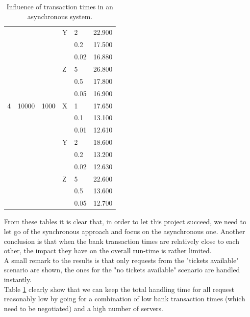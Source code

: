 \documentclass[10pt,a4paper,twocolumn]{article}
\begin{document}
\begin{table}[t]
{\begin{tabular}{llllll}
									&									& 								  &Y				   & 2 							& 22.900 \\
									&									& 								  &						& 0.2 						& 17.500\\
									&									& 								  &						& 0.02 					   & 16.880 \\
									&									& 								  &Z				   & 5 							& 26.800 \\
									&									& 								  &						& 0.5 						& 17.800\\
									&									& 								  &						& 0.05 					   & 16.900\\
	4 								& 10000 					  & 1000 						& X					 & 1 						  & 17.650 \\
									&									& 								  &						& 0.1 						& 13.100 \\
									&									& 								  &						& 0.01 					   & 12.610 \\
									&									& 								  &Y				   & 2 							& 18.600 \\
									&									& 								  &						& 0.2 						& 13.200\\
									&									& 								  &						& 0.02 					   & 12.630 \\
									&									& 								  &Z				   & 5 							& 22.600 \\
									&									& 								  &						& 0.5 						& 13.600\\
									&									& 								  &						& 0.05 					   & 12.700\\
	\end{tabular}}
	\caption{\label{tab:banking-time-influence-asynchronous}Influence of transaction times in an asynchronous system.}
\end{table}\noindent
From these tables it is clear that, in order to let this project succeed, we need to let go of the synchronous approach and focus on the asynchronous one. Another conclusion is that when the bank transaction times are relatively close to each other, the impact they have on the overall run-time is rather limited.\\
A small remark to the results is that only requests from the "tickets available" scenario are shown, the ones for the "no tickets available" scenario are handled instantly.\\
Table \ref{tab:banking-time-influence-asynchronous} clearly show that we can keep the total handling time for all request reasonably low by going for a combination of low bank transaction times (which need to be negotiated) and a high number of servers.
\end{document}
